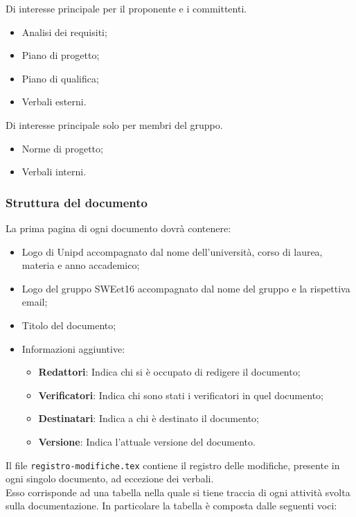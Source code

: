     Di interesse principale per il proponente e i committenti.

\begin{itemize}
\item Analisi dei requisiti;
\item Piano di progetto;
\item Piano di qualifica;
\item Verbali esterni.
\end{itemize}

    Di interesse principale solo per membri del gruppo.

\begin{itemize}
\item Norme di progetto;
\item Verbali interni.
\end{itemize}

\subsubsection{Struttura del documento}

        La prima pagina di ogni documento dovrà contenere:

\begin{itemize}
\item Logo di Unipd accompagnato dal nome dell'università, corso di laurea, materia e anno accademico;
\item Logo del gruppo SWEet16 accompagnato dal nome del gruppo e la rispettiva email;
\item Titolo del documento;
\item Informazioni aggiuntive:
\begin{itemize}
\item \textbf{Redattori}: Indica chi si è occupato di redigere il documento;
\item \textbf{Verificatori}: Indica chi sono stati i verificatori in quel documento;
\item \textbf{Destinatari}: Indica a chi è destinato il documento;
\item \textbf{Versione}: Indica l'attuale versione del documento.
\end{itemize}
\end{itemize}


        Il file \texttt{registro-modifiche.tex} contiene il registro delle modifiche, presente in ogni singolo documento, ad eccezione dei verbali. \\
        Esso corrisponde ad una tabella nella quale si tiene traccia di ogni attività svolta sulla documentazione.
        In particolare la tabella è composta dalle seguenti voci:

